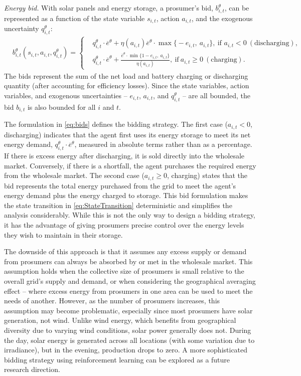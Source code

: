\documentclass{article}
\theoremstyle{definition}
\theoremstyle{plain}
\begin{document}
\textit{Energy bid.} With solar panels and energy storage, a prosumer's bid, \(b^{\theta}_{i,t}\), can be represented as a function of the state variable $s_{i,t}$, action $a_{i,t}$, and the exogenous uncertainty $q^{\theta}_{i,t}$:
\begin{align}\label{eq:bids}
& b^{\theta}_{i,t}(s_{i,t}, a_{i,t}, q^{\theta}_{i,t}) =  \left\{
\begin{aligned}
& q^{\theta}_{i,t}\cdot \overline{e}^{\theta} + \eta(a_{i,t})\overline{e}^{\theta} \cdot \max \big\{-e_{i,t},\ a_{i,t} \big\}, \ \text{if  } a_{i,t} < 0\ \mathrm{(discharging)},\\[8pt]
&  q^{\theta}_{i,t} \cdot \overline{e}^{\theta} +  \frac{\overline{e}^{\theta}\cdot \min \big\{1-e_{i,t},\ a_{i,t}\big\}}{\eta(a_{i,t})}, \ \text{if} \ a_{i,t} \geq 0\ \mathrm{(charging)}. 
\end{aligned}
\right.
\end{align}
The bids represent the sum of the net load and battery charging or discharging quantity (after accounting for efficiency losses). Since the state variables, action variables, and exogenous uncertainties -- $e_{i,t}$, $a_{i,t}$, and $q^{\theta}_{i,t}$ -- are all bounded, the bid $b_{i,t}$ is also bounded for all $i$ and $t$.

The formulation in \eqref{eq:bids} defines the bidding strategy. The first case (\( a_{i,t} < 0 \), discharging) indicates that the agent first uses its energy storage to meet its net energy demand, \( q^{\theta}_{i,t} \cdot \overline{e}^{\theta} \), measured in absolute terms rather than as a percentage. If there is excess energy after discharging, it is sold directly into the wholesale market. Conversely, if there is a shortfall, the agent purchases the required energy from the wholesale market.  
The second case (\( a_{i,t} \geq 0 \), charging) states that the bid represents the total energy purchased from the grid to meet the agent's energy demand plus the energy charged to storage. This bid formulation makes the state transition in \eqref{eq:StateTransition} deterministic and simplifies the analysis considerably. While this is not the only way to design a bidding strategy, it has the advantage of giving prosumers precise control over the energy levels they wish to maintain in their storage.

The downside of this approach is that it assumes any excess supply or demand from prosumers can always be absorbed by or met in the wholesale market. This assumption holds when the collective size of prosumers is small relative to the overall grid’s supply and demand, or when considering the geographical averaging effect -- where excess energy from prosumers in one area can be used to meet the needs of another. However, as the number of prosumers increases, this assumption may become problematic, especially since most prosumers have solar generation, not wind. Unlike wind energy, which benefits from geographical diversity due to varying wind conditions, solar power generally does not. During the day, solar energy is generated across all locations (with some variation due to irradiance), but in the evening, production drops to zero. A more sophisticated bidding strategy using reinforcement learning can be explored as a future research direction.
\end{document}
